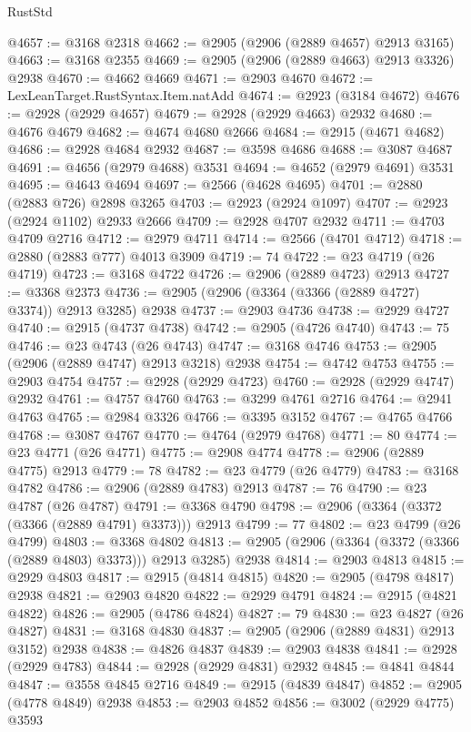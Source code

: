 \begin{lexlean}{RustStd}
\begin{coremodule}
@4657 := @3168 @2318
@4662 := @2905 (@2906 (@2889 @4657) @2913 @3165)
@4663 := @3168 @2355
@4669 := @2905 (@2906 (@2889 @4663) @2913 @3326) @2938
@4670 := @4662 @4669
@4671 := @2903 @4670
@4672 := LexLeanTarget.RustSyntax.Item.natAdd
@4674 := @2923 (@3184 @4672)
@4676 := @2928 (@2929 @4657)
@4679 := @2928 (@2929 @4663) @2932
@4680 := @4676 @4679
@4682 := @4674 @4680 @2666
@4684 := @2915 (@4671 @4682)
@4686 := @2928 @4684 @2932
@4687 := @3598 @4686
@4688 := @3087 @4687
@4691 := @4656 (@2979 @4688) @3531
@4694 := @4652 (@2979 @4691) @3531
@4695 := @4643 @4694
@4697 := @2566 (@4628 @4695)
@4701 := @2880 (@2883 @726) @2898 @3265
@4703 := @2923 (@2924 @1097)
@4707 := @2923 (@2924 @1102) @2933 @2666
@4709 := @2928 @4707 @2932
@4711 := @4703 @4709 @2716
@4712 := @2979 @4711
@4714 := @2566 (@4701 @4712)
@4718 := @2880 (@2883 @777) @4013 @3909
@4719 := 74
@4722 := @23 @4719 (@26 @4719)
@4723 := @3168 @4722
@4726 := @2906 (@2889 @4723) @2913
@4727 := @3368 @2373
@4736 := @2905 (@2906 (@3364 (@3366 (@2889 @4727) @3374)) @2913 @3285) @2938
@4737 := @2903 @4736
@4738 := @2929 @4727
@4740 := @2915 (@4737 @4738)
@4742 := @2905 (@4726 @4740)
@4743 := 75
@4746 := @23 @4743 (@26 @4743)
@4747 := @3168 @4746
@4753 := @2905 (@2906 (@2889 @4747) @2913 @3218) @2938
@4754 := @4742 @4753
@4755 := @2903 @4754
@4757 := @2928 (@2929 @4723)
@4760 := @2928 (@2929 @4747) @2932
@4761 := @4757 @4760
@4763 := @3299 @4761 @2716
@4764 := @2941 @4763
@4765 := @2984 @3326
@4766 := @3395 @3152
@4767 := @4765 @4766
@4768 := @3087 @4767
@4770 := @4764 (@2979 @4768)
@4771 := 80
@4774 := @23 @4771 (@26 @4771)
@4775 := @2908 @4774
@4778 := @2906 (@2889 @4775) @2913
@4779 := 78
@4782 := @23 @4779 (@26 @4779)
@4783 := @3168 @4782
@4786 := @2906 (@2889 @4783) @2913
@4787 := 76
@4790 := @23 @4787 (@26 @4787)
@4791 := @3368 @4790
@4798 := @2906 (@3364 (@3372 (@3366 (@2889 @4791) @3373))) @2913
@4799 := 77
@4802 := @23 @4799 (@26 @4799)
@4803 := @3368 @4802
@4813 := @2905 (@2906 (@3364 (@3372 (@3366 (@2889 @4803) @3373))) @2913 @3285) @2938
@4814 := @2903 @4813
@4815 := @2929 @4803
@4817 := @2915 (@4814 @4815)
@4820 := @2905 (@4798 @4817) @2938
@4821 := @2903 @4820
@4822 := @2929 @4791
@4824 := @2915 (@4821 @4822)
@4826 := @2905 (@4786 @4824)
@4827 := 79
@4830 := @23 @4827 (@26 @4827)
@4831 := @3168 @4830
@4837 := @2905 (@2906 (@2889 @4831) @2913 @3152) @2938
@4838 := @4826 @4837
@4839 := @2903 @4838
@4841 := @2928 (@2929 @4783)
@4844 := @2928 (@2929 @4831) @2932
@4845 := @4841 @4844
@4847 := @3558 @4845 @2716
@4849 := @2915 (@4839 @4847)
@4852 := @2905 (@4778 @4849) @2938
@4853 := @2903 @4852
@4856 := @3002 (@2929 @4775) @3593

\end{coremodule}
\end{lexlean}
